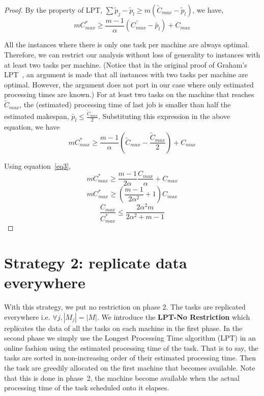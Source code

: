 \documentclass[10pt, conference, compsocconf]{IEEEtran}
\begin{document}
\begin{proof}
 By the property of LPT, $\sum \tilde p_j-\tilde p_l \geq m (\tilde C_{max}-\tilde p_l)$, we have,
\begin{equation}\nonumber 
  m C_{max}^{*}\geq \frac{m-1}{\alpha } \left( \tilde{C_{max}} - \tilde{ p_l} \right) + {C_{max}}
 \end{equation}
 
 All the instances where there is only one task per machine are always
 optimal. Therefore, we can restrict our analysis without loss of
 generality to instances with at least two tasks per machine. (Notice
 that in the original proof of Graham's LPT~\cite{Graham69boundson},
 an argument is made that all instances with two tasks per machine are
 optimal. However, the argument does not port in our case where only
 estimated processing times are known.) For at least two tasks on the
 machine that reaches $\tilde{C}_{max}$, the (estimated)
 processing time of last job is smaller than half the estimated
 makespan, $\tilde{p_l} \leq \frac{\tilde{C}_{max}}{2}$. Substituting
 this expression in the above equation, we have
\begin{equation}\nonumber
 m C_{max}^{*}\geq \frac{m-1}{\alpha } \left( \tilde C_{max}-\frac{\tilde C_{max}}{2} \right ) + {C_{max}}
\end{equation}

Using equation~\ref{eq3},
\begin{equation}\nonumber
 m C_{max}^{*}\geq \frac{m-1}{2\alpha } \frac{C_{max}} {\alpha} + {C_{max}}
\end{equation}
\begin{equation}\nonumber
 m C_{max}^{*}\geq \left( \frac{m-1}{2\alpha^{2} } +1\right){C_{max}}
\end{equation}
\begin{equation}\nonumber
\frac{C_{max}}{C_{max}^{*}}\leq \frac{2\alpha^{2}m}{2\alpha^{2}+ m-1}
\end{equation}
\end{proof} 

\section{Strategy 2: replicate data everywhere}\label{sec5}

With this strategy, we put no restriction on phase 2. The tasks are
replicated everywhere i.e. $\forall j, |M_{j}|=|M|$. We introduce the
\textbf{LPT-No Restriction} which replicates the data of all the tasks
on each machine in the first phase. In the second phase we simply use
the Longest Processing Time algorithm (LPT) in an online fashion using
the estimated processing time of the task. That is to say, the tasks
are sorted in non-increasing order of their estimated processing
time. Then the task are greedily allocated on the first
machine that becomes available. Note that this is done in phase~2,
the machine become available when the actual processing time of
the task scheduled onto it elapses.
\end{document}
